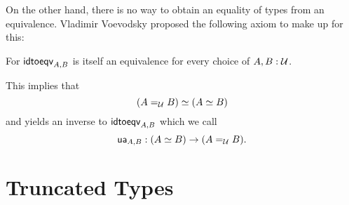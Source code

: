On the other hand, there is no way to obtain an equality of types from an equivalence.
Vladimir Voevodsky proposed the following axiom to make up for this:
\begin{axiom}[Univalence]
For $\mathsf{idtoeqv}_{A, B}$ is itself an equivalence for every choice of $A, B : \mathcal{U}$.

This implies that
\begin{equation*}
(A =_{\mathcal{U}} B) \simeq (A \simeq B)
\end{equation*}
and yields an inverse to $\mathsf{idtoeqv}_{A, B}$ which we call
\begin{equation*}
\mathsf{ua}_{A, B} : (A \simeq B) \to (A =_{\mathcal{U}} B) \text{.}
\end{equation*}
\end{axiom}

\section{Truncated Types}
